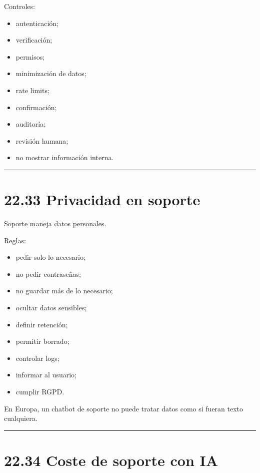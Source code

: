 Controles:

\begin{itemize}
\tightlist
\item
  autenticación;
\item
  verificación;
\item
  permisos;
\item
  minimización de datos;
\item
  rate limits;
\item
  confirmación;
\item
  auditoría;
\item
  revisión humana;
\item
  no mostrar información interna.
\end{itemize}

\begin{center}\rule{0.5\linewidth}{0.5pt}\end{center}

\section{22.33 Privacidad en soporte}\label{privacidad-en-soporte}

Soporte maneja datos personales.

Reglas:

\begin{itemize}
\tightlist
\item
  pedir solo lo necesario;
\item
  no pedir contraseñas;
\item
  no guardar más de lo necesario;
\item
  ocultar datos sensibles;
\item
  definir retención;
\item
  permitir borrado;
\item
  controlar logs;
\item
  informar al usuario;
\item
  cumplir RGPD.
\end{itemize}

En Europa, un chatbot de soporte no puede tratar datos como si fueran
texto cualquiera.

\begin{center}\rule{0.5\linewidth}{0.5pt}\end{center}

\section{22.34 Coste de soporte con IA}\label{coste-de-soporte-con-ia}

